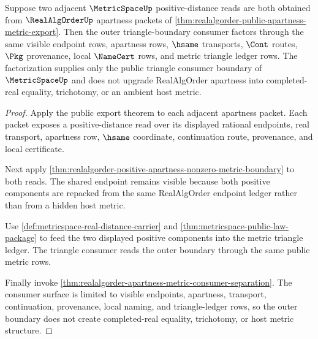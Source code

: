 \begin{theorem}
\label{thm:realalgorder-metricspace-apartness-triangle-consumer}
Suppose two adjacent $\MetricSpaceUp$ positive-distance reads are both obtained
from $\RealAlgOrderUp$ apartness packets of
\autoref{thm:realalgorder-public-apartness-metric-export}. Then the outer
triangle-boundary consumer factors through the same visible endpoint rows,
apartness rows, $\hsame$ transports, $\Cont$ routes, $\Pkg$ provenance, local
$\NameCert$ rows, and metric triangle ledger rows. The factorization supplies
only the public triangle consumer boundary of $\MetricSpaceUp$ and does not
upgrade RealAlgOrder apartness into completed-real equality, trichotomy, or an
ambient host metric.
\end{theorem}
\begin{proof}
Apply the public export theorem to each adjacent apartness packet. Each packet
exposes a positive-distance read over its displayed rational endpoints, real
transport, apartness row, $\hsame$ coordinate, continuation route, provenance,
and local certificate.

Next apply
\autoref{thm:realalgorder-positive-apartness-nonzero-metric-boundary} to both
reads. The shared endpoint remains visible because both positive components are
repacked from the same RealAlgOrder endpoint ledger rather than from a hidden
host metric.

Use \autoref{def:metricspace-real-distance-carrier} and
\autoref{thm:metricspace-public-law-package} to feed the two displayed positive
components into the metric triangle ledger. The triangle consumer reads the
outer boundary through the same public metric rows.

Finally invoke
\autoref{thm:realalgorder-apartness-metric-consumer-separation}. The consumer
surface is limited to visible endpoints, apartness, transport, continuation,
provenance, local naming, and triangle-ledger rows, so the outer boundary does
not create completed-real equality, trichotomy, or host metric structure.
\end{proof}

